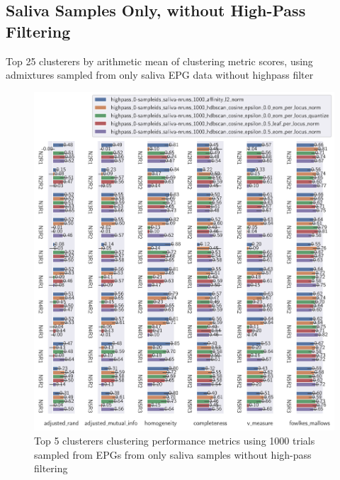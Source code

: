 \begin{theappendices}
\FloatBarrier
\subsection{Saliva Samples Only, without High-Pass Filtering}

\begin{table}[htbp]
\centering
{}
\caption{Top 25 clusterers by arithmetic mean of clustering metric scores, using admixtures sampled from only saliva EPG data without highpass filter}
\label{appendix:table:top_25_not_ensemble_clusterers_by_metrics_highpass_0-sampleids_saliva-nruns_1000}
\end{table}

\begin{figure}[htbp]
\centering
\includegraphics[width=\textwidth]{./figures/clust_comparison/highpass_0-sampleids_saliva-nruns_1000_top_5_clusterers_by_metrics.pdf}
\caption{Top 5 clusterers clustering performance metrics using 1000 trials sampled from EPGs from only saliva samples without high-pass filtering}
\label{appendix:fig:highpass_0-sampleids_saliva-nruns_1000_top_5_clusterers_by_metrics}
\end{figure}


\end{theappendices}
